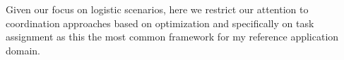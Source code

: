 Given our focus on logistic scenarios, here we restrict our attention to coordination
approaches based on optimization and specifically on task assignment as this the most 
common framework for my reference application domain.







